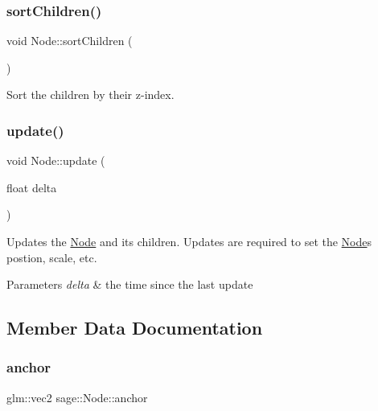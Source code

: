\subsubsection{\texorpdfstring{sortChildren()}{sortChildren()}}
{\footnotesize\ttfamily void Node\+::sort\+Children (\begin{DoxyParamCaption}{ }\end{DoxyParamCaption})\hspace{0.3cm}{\ttfamily [protected]}}



Sort the children by their z-\/index. 

\mbox{\label{classsage_1_1Node_a32878481ba54b3856ab53c10af13848e}} 
\subsubsection{\texorpdfstring{update()}{update()}}
{\footnotesize\ttfamily void Node\+::update (\begin{DoxyParamCaption}\item[{float}]{delta }\end{DoxyParamCaption})\hspace{0.3cm}{\ttfamily [virtual]}}



Updates the \mbox{\hyperlink{classsage_1_1Node}{Node}} and its children. Updates are required to set the \mbox{\hyperlink{classsage_1_1Node}{Node}}\textquotesingle{}s postion, scale, etc. 


\begin{DoxyParams}{Parameters}
{\em delta} & the time since the last update \\
\hline
\end{DoxyParams}


\subsection{Member Data Documentation}
\mbox{\label{classsage_1_1Node_a0956f07efec6dcbd3cf796a9028b9175}} 
\subsubsection{\texorpdfstring{anchor}{anchor}}
{\footnotesize\ttfamily glm\+::vec2 sage\+::\+Node\+::anchor\hspace{0.3cm}{\ttfamily [protected]}}

